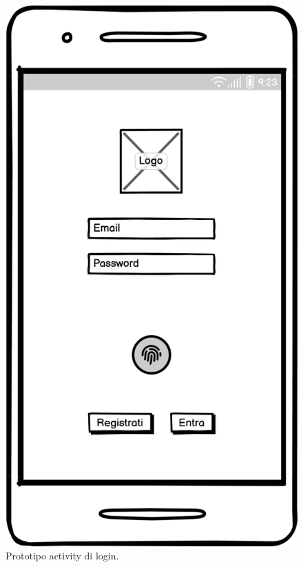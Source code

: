 \documentclass[a4paper,final,12pt]{report}
\begin{document}
\begin{figure}[hbtp]
\centering
\includegraphics[scale=0.30]{img_concettuale/LoginMobile.png}
\caption{Prototipo activity di login.}
\label{figura:l}
\end{figure}
\end{document}
